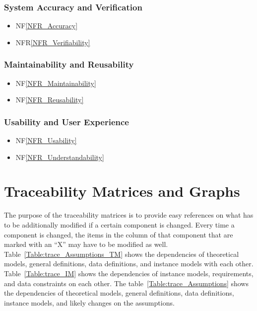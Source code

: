 \documentclass[12pt]{article}
\begin{document}
  \subsubsection{System Accuracy and Verification}
  \label{subsec:System Accuracy and Verification}
  \begin{itemize}
      \item NF\ref{NFR_Accuracy}
      \item NFR\ref{NFR_Verifiability}
  \end{itemize}
  
  \subsubsection{Maintainability and Reusability}
  \label{subsec:Maintainability and Reusability}
  \begin{itemize}
      \item NF\ref{NFR_Maintainability}
      \item NF\ref{NFR_Reusability} 
  \end{itemize}

  \subsubsection{Usability and User Experience}
  \label{subsec:Usability and User Experience}
  \begin{itemize}
      \item NF\ref{NFR_Usability}
      \item NF\ref{NFR_Understandability}
  \end{itemize}
  
\section{Traceability Matrices and Graphs}

The purpose of the traceability matrices is to provide easy references on what
has to be additionally modified if a certain component is changed.  Every time a
component is changed, the items in the column of that component that are marked
with an ``X'' may have to be modified as well.  Table~\ref{Table:trace_Assumptions_TM} shows the
dependencies of theoretical models, general definitions, data definitions, and
instance models with each other. Table~\ref{Table:trace_IM} shows the
dependencies of instance models, requirements, and data constraints on each
other. The table~\ref{Table:trace_Assumptions} shows the dependencies of theoretical models,
general definitions, data definitions, instance models, and likely changes on
the assumptions.
\clearpage
\FloatBarrier
\end{document}
